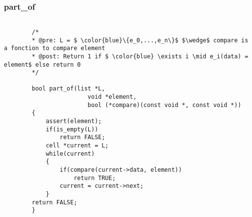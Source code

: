 \documentclass[a4paper, 11pt, oneside]{article}
\begin{document}
	\subsubsection{part\_of}
	
	\begin{lstlisting}[mathescape]
	
		/*
		* @pre: L = $ \color{blue}\{e_0,...,e_n\}$ $\wedge$ compare is a fonction to compare element
		* @post: Return 1 if $ \color{blue} \exists i \mid e_i(data) = element$ else return 0
		*/
		
		bool part_of(list *L, 
						void *element, 
						bool (*compare)(const void *, const void *))
		{
   			assert(element);
   			if(is_empty(L))
      			return FALSE;
   			cell *current = L;
   			while(current)
   			{
      			if(compare(current->data, element))
         			return TRUE;
      			current = current->next;
   			}
   		return FALSE;
		}
	
	\end{lstlisting}
\end{document}
